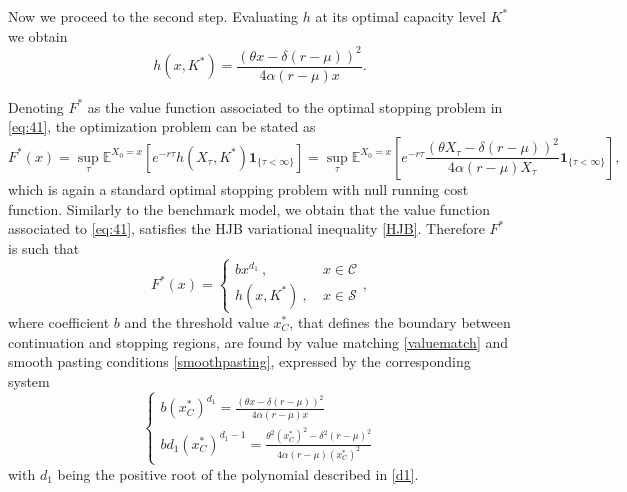 Now we proceed to the second step. Evaluating $h$ at its optimal capacity level $K^*$ we obtain
$$h(x,K^*)=\frac{(\theta x -\delta (r-\mu))^2}{4 \alpha (r-\mu) x}.$$

Denoting $F^*$ as the value function associated to the optimal stopping problem in \eqref{eq:41}, the optimization problem can be stated as
\begin{equation}
F^*(x)=\sup_\tau \mathds{E}^{X_0=x}\left[ e^{-r\tau}h(X_\tau,K^*) \textbf{1}_{\{\tau<\infty\}} \right]
= \sup_\tau \mathds{E}^{X_0=x}\left[ e^{-r\tau} \frac{(\theta X_\tau -\delta (r-\mu))^2}{4 \alpha (r-\mu) X_\tau} \textbf{1}_{\{\tau<\infty\}}\right],
\label{eq:41}
\end{equation}
which is again a standard optimal stopping problem with null running cost function. Similarly to the benchmark model, we obtain that the value function associated to \eqref{eq:41}, satisfies the HJB variational inequality \eqref{HJB}. Therefore $F^*$ is such that
\begin{equation}
F^*(x)=\begin{cases} b x^{d_1}  \ , \ &x \in \mathcal{C} \\
h(x,K^*) \ , \ &x \in \mathcal{S}
\end{cases},
\label{1_F*}
\end{equation}
where coefficient $b$ and the threshold value $x_C^*$, that defines the boundary between continuation and stopping regions, are found by value matching \eqref{valuematch} and smooth pasting conditions \eqref{smoothpasting}, expressed by the corresponding system
\begin{equation}
\begin{cases} b (x_C^*)^{d_1}=\frac{(\theta x -\delta (r-\mu))^2}{4 \alpha (r-\mu) x} \\
b d_1(x_C^*)^{d_1-1}=\frac{\theta^2 (x_C^*)^2 -\delta^2 (r-\mu)^2}{4 \alpha (r-\mu) (x_C^*)^2}
\end{cases}
\label{eq:sistema3}
\end{equation}
with $d_1$ being the positive root of the polynomial described in \eqref{d1}.

